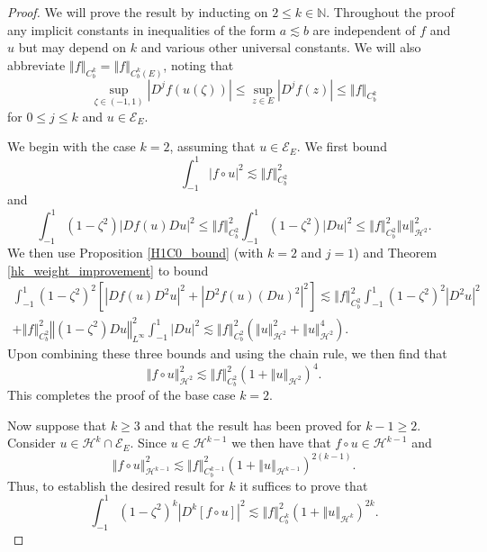 \documentclass[11pt,reqno]{amsart}
\numberwithin{equation}{section}
\providecommand{\abs}[1]{\left\vert#1\right\vert}
\providecommand{\norm}[1]{\left\Vert#1\right\Vert}
\def\ls{\lesssim}
\providecommand{\abs}[1]{\left\vert#1\right\vert}
\providecommand{\norm}[1]{\left\Vert#1\right\Vert}
\def\ls{\lesssim}
\def\h{\mathcal{H}}
\def\N{\mathbb{N}}
\begin{document}
\begin{proof}
We will prove the result by inducting on $2\le k \in \N$.  Throughout the proof any implicit constants in inequalities of the form $a \ls b$ are independent of $f$ and $u$ but may depend on $k$ and various other universal constants.  We will also abbreviate $\norm{f}_{C^k_b} = \norm{f}_{C^k_b(E)}$, noting that 
\begin{equation}
\sup_{\zeta \in (-1,1)}  \abs{D^jf(u(\zeta))} \le \sup_{z\in E} \abs{D^j f(z)}  \le \norm{f}_{C^k_b} 
\end{equation}
for $0 \le j \le k$ and $u\in \mathcal{E}_E$.
 

We begin with the case $k=2$, assuming that $u \in \mathcal{E}_E$.  We first bound 
\begin{equation}
 \int_{-1}^1 \abs{f\circ u}^2 \ls \norm{f}_{C^2_b}^2
\end{equation}
and 
\begin{equation}
 \int_{-1}^1 (1-\zeta^2) \abs{Df(u) Du}^2 \le \norm{f}_{C^2_b}^2 \int_{-1}^1 (1-\zeta^2) \abs{Du}^2 \le  \norm{f}_{C^2_b}^2 \norm{u}_{\h^2}^2.
\end{equation}
We then use Proposition \ref{H1C0_bound} (with $k=2$ and $j=1$) and Theorem \ref{hk_weight_improvement} to bound 
\begin{multline}
  \int_{-1}^1 (1-\zeta^2)^2 [\abs{Df(u) D^2 u}^2 + \abs{D^2f(u) (Du)^2 }^2  ] \ls \norm{f}_{C^2_b}^2 \int_{-1}^1 (1-\zeta^2)^2 \abs{D^2u}^2 \\
  +  \norm{f}_{C^2_b}^2 \norm{(1-\zeta^2) D u}_{L^\infty}^2 \int_{-1}^1 \abs{Du}^2 \ls \norm{f}_{C^2_b}^2(\norm{u}_{\h^2}^2 + \norm{u}_{\h^2}^4   ).
\end{multline}
Upon combining these three bounds and using the chain rule, we then find that 
\begin{equation}
 \norm{f\circ u}_{\h^2}^2 \ls \norm{f}_{C^2_b}^2  (1+\norm{u}_{\h^2})^4.
\end{equation}
This completes the proof of the base case $k=2$. 
 


Now suppose that $k \ge 3$ and that the result has been proved for $k-1 \ge 2$.  Consider $u \in \h^k \cap \mathcal{E}_E$. Since $u \in \h^{k-1}$ we then have that  $f \circ u \in \h^{k-1}$ and  
\begin{equation}
 \norm{f\circ u}_{\h^{k-1}}^2 \ls \norm{f}_{C^{k-1}_b}^2  (1+\norm{u}_{\h^{k-1}})^{2(k-1)}.
\end{equation}
Thus, to establish the desired result for $k$ it suffices to prove that 
\begin{equation}\label{hk_composition_1}
 \int_{-1}^1 (1-\zeta^2)^k \abs{ D^k  [ f\circ u ] }^2  \ls \norm{f}_{C^k_b}^2  (1+\norm{u}_{\h^k})^{2k}.
\end{equation}


\end{proof}
\end{document}
